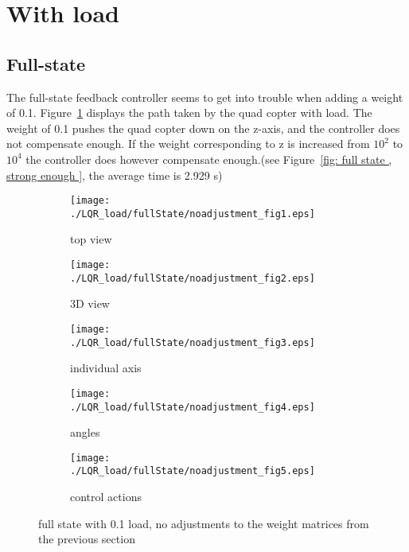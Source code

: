 \section{With load}
\subsection{Full-state}
The full-state feedback controller seems to get into trouble when adding a weight of 0.1. Figure~\ref{fig: full state unadjusted , not strong enough } displays the path taken by the quad copter with load. The weight of 0.1 pushes the quad copter down on the z-axis, and the controller does not compensate enough. If the weight corresponding to z is increased from $10^2$ to $10^4$ the controller does however compensate enough.(see Figure~\ref{fig: full state , strong enough }, the average time is  2.929 s)
\begin{figure}[H]
	\centering
	\begin{subfigure}[b]{0.3\textwidth}
		\texttt{[image: ./LQR\_load/fullState/noadjustment\_fig1.eps]}
		\caption{top view}
	\end{subfigure}
	\begin{subfigure}[b]{0.3\textwidth}
		\texttt{[image: ./LQR\_load/fullState/noadjustment\_fig2.eps]}
		\caption{3D view}
		\label{fig: full state unadjusted , not strong enough }
	\end{subfigure}
	\begin{subfigure}[b]{0.3\textwidth}
		\texttt{[image: ./LQR\_load/fullState/noadjustment\_fig3.eps]}
		\caption{individual axis}
	\end{subfigure}
	\begin{subfigure}[b]{0.3\textwidth}
		\texttt{[image: ./LQR\_load/fullState/noadjustment\_fig4.eps]}
		\caption{angles}
	\end{subfigure}
	\begin{subfigure}[b]{0.3\textwidth}
		\texttt{[image: ./LQR\_load/fullState/noadjustment\_fig5.eps]}
		\caption{control actions}
	\end{subfigure}
	\caption{full state with 0.1 load, no adjustments to the weight matrices from the previous section }\label{fig:full state with load unadjusted}
\end{figure}

